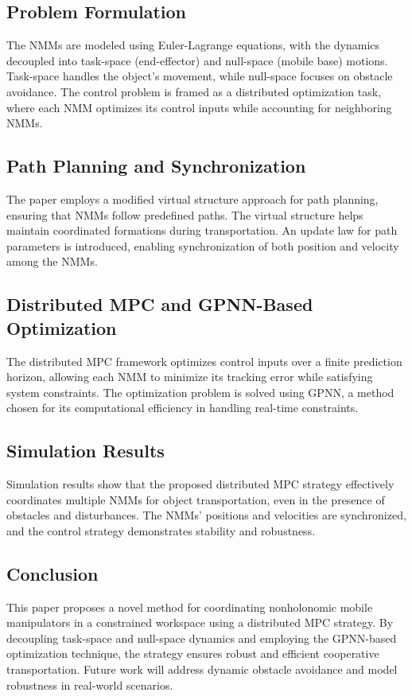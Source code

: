 \documentclass[a4paper,12pt]{article}
\begin{document}
\subsection{Problem Formulation}
The NMMs are modeled using Euler-Lagrange equations, with the dynamics decoupled into task-space (end-effector) and null-space (mobile base) motions. Task-space handles the object’s movement, while null-space focuses on obstacle avoidance. The control problem is framed as a distributed optimization task, where each NMM optimizes its control inputs while accounting for neighboring NMMs.

\subsection{Path Planning and Synchronization}
The paper employs a modified virtual structure approach for path planning, ensuring that NMMs follow predefined paths. The virtual structure helps maintain coordinated formations during transportation. An update law for path parameters is introduced, enabling synchronization of both position and velocity among the NMMs.

\subsection{Distributed MPC and GPNN-Based Optimization}
The distributed MPC framework optimizes control inputs over a finite prediction horizon, allowing each NMM to minimize its tracking error while satisfying system constraints. The optimization problem is solved using GPNN, a method chosen for its computational efficiency in handling real-time constraints.

\subsection{Simulation Results}
Simulation results show that the proposed distributed MPC strategy effectively coordinates multiple NMMs for object transportation, even in the presence of obstacles and disturbances. The NMMs' positions and velocities are synchronized, and the control strategy demonstrates stability and robustness.

\subsection{Conclusion}
This paper proposes a novel method for coordinating nonholonomic mobile manipulators in a constrained workspace using a distributed MPC strategy. By decoupling task-space and null-space dynamics and employing the GPNN-based optimization technique, the strategy ensures robust and efficient cooperative transportation. Future work will address dynamic obstacle avoidance and model robustness in real-world scenarios.
\end{document}
